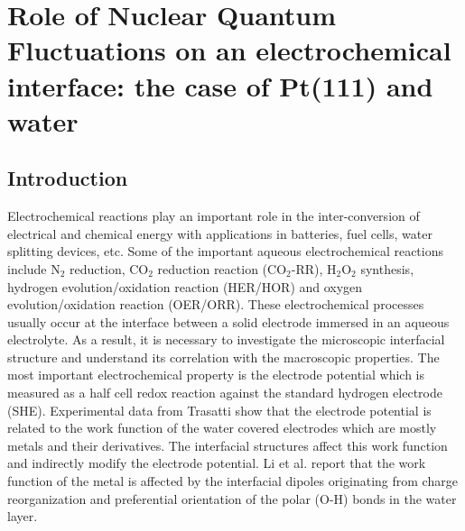 \chapter{Role of Nuclear Quantum Fluctuations
on an electrochemical interface: the case of Pt(111) and water } \label{chapter3}
\ifpdf
    \graphicspath{{Chapter3/Chapter3Figs/}}
\fi
 
\section{Introduction}

Electrochemical reactions play an important role in the inter-conversion of electrical and chemical energy with applications in batteries\cite{etacheri2011challenges}, fuel cells\cite{felseghi2019hydrogen}, water splitting devices\cite{grigoriev2020current}, etc. Some of the important aqueous electrochemical reactions include N$_2$ reduction\cite{qing2020recent}, CO$_2$ reduction reaction\cite{lim2014review}  (CO$_2$-RR), H$_2$O$_2$ synthesis\cite{jiang2018selective}, hydrogen evolution/oxidation reaction\cite{zeng2015recent,strmcnik2013improving} (HER/HOR) and oxygen evolution/oxidation reaction\cite{suen2017electrocatalysis,stacy2017recent} (OER/ORR). These electrochemical processes usually occur at the interface between a solid electrode immersed in an aqueous electrolyte. As a result, it is necessary to investigate the microscopic interfacial structure and understand its correlation with the macroscopic properties. The most important electrochemical property is the electrode potential which is measured as a half cell redox reaction against the standard hydrogen electrode (SHE). Experimental data from Trasatti\cite{trasatti1991structure,trasatti1983structuring} show that the electrode potential is related to the work function of the water covered electrodes which are mostly metals and their derivatives\cite{conway2002interfacial,subbaraman2011enhancing,le2009hydrogenases,du2012catalysts,jaramillo2007identification,voiry2013enhanced,merki2011recent}. The interfacial structures affect this work function and indirectly modify the electrode potential. Li et al.\cite{li2021establishment} report that the work function of the metal is affected by the interfacial dipoles originating from charge reorganization and preferential orientation of the polar (O-H) bonds in the water layer.

